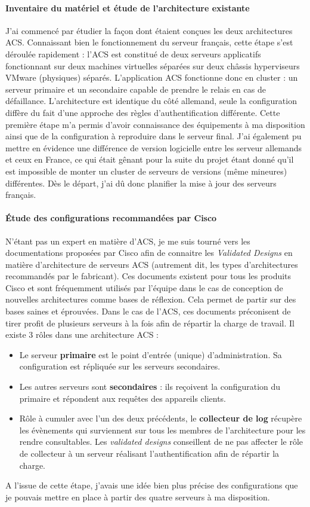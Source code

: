 \documentclass[a4paper,12pt]{report}
\begin{document}
\paragraph*{Inventaire du matériel et étude de l'architecture existante}
J'ai commencé par étudier la façon dont étaient conçues les deux architectures ACS. Connaissant bien le fonctionnement du serveur français, cette étape s'est déroulée rapidement : l'ACS est constitué de deux serveurs applicatifs fonctionnant sur deux machines virtuelles séparées sur deux châssis hyperviseurs VMware (physiques) séparés. L'application ACS fonctionne donc en cluster : un serveur primaire et un secondaire capable de prendre le relais en cas de défaillance. L'architecture est identique du côté allemand, seule la configuration diffère du fait d'une approche des règles d'authentification différente. Cette première étape m'a permis d'avoir connaissance des équipements à ma disposition ainsi que de la configuration à reproduire dans le serveur final. J'ai également pu mettre en évidence une différence de version logicielle entre les serveur allemands et ceux en France, ce qui était gênant pour la suite du projet étant donné qu'il est impossible de monter un cluster de serveurs de versions (même mineures) différentes. Dès le départ, j'ai dû donc planifier la mise à jour des serveurs français.

\paragraph*{Étude des configurations recommandées par Cisco}
N'étant pas un expert en matière d'ACS, je me suis tourné vers les documentations proposées par Cisco afin de connaitre les \textit{Validated Designs} en matière d'architecture de serveurs ACS (autrement dit, les types d'architectures recommandés par le fabricant). Ces documents existent pour tous les produits Cisco et sont fréquemment utilisés par l'équipe dans le cas de conception de nouvelles architectures comme bases de réflexion. Cela permet de partir sur des bases saines et éprouvées. Dans le cas de l'ACS, ces documents préconisent de tirer profit de plusieurs serveurs à la fois afin de répartir la charge de travail. Il existe 3 rôles dans une architecture ACS : 
\begin{itemize}
\item
Le serveur \textbf{primaire} est le point d'entrée (unique) d'administration. Sa configuration est répliquée sur les serveurs secondaires.
\item
Les autres serveurs sont \textbf{secondaires} : ils reçoivent la configuration du primaire et répondent aux requêtes des appareils clients.
\item
Rôle à cumuler avec l'un des deux précédents, le \textbf{collecteur de log} récupère les évènements qui surviennent sur tous les membres de l'architecture pour les rendre consultables. Les \textit{validated designs} conseillent de ne pas affecter le rôle de collecteur à un serveur réalisant l'authentification afin de répartir la charge.
\end{itemize}  
A l'issue de cette étape, j'avais une idée bien plus précise des configurations que je pouvais mettre en place à partir des quatre serveurs à ma disposition.
\end{document}
